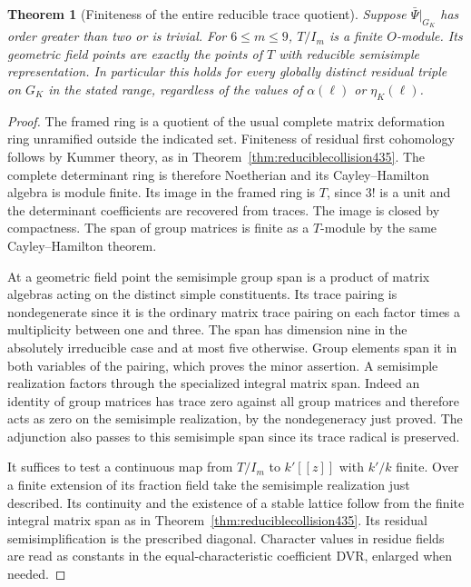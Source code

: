 \documentclass[a4paper,11pt]{article}
\newtheorem{theorem}[proposition]{Theorem}
\theoremstyle{definition}
\theoremstyle{remark}
\numberwithin{equation}{section}
\begin{document}
\begin{theorem}[Finiteness of the entire reducible trace quotient]\leavevmode
\label{thm:scalarinertiaplanes439}
Suppose \(\bar\Psi|_{G_K}\) has order greater than two or
is trivial. For \(6\le m\le9\), \(T/I_m\) is a finite
\(O\)-module. Its geometric field points are exactly the
points of \(T\) with reducible semisimple representation.
In particular this holds for every globally distinct residual
triple on \(G_K\) in the stated range, regardless of the
values of \(\alpha(\ell)\) or \(\eta_K(\ell)\).
\end{theorem}
\begin{proof}
The framed ring is a quotient of the usual complete matrix
deformation ring unramified outside the indicated set.
Finiteness of residual first cohomology follows by Kummer
theory, as in Theorem~\ref{thm:reduciblecollision435}.
The complete determinant ring is therefore Noetherian and
its Cayley--Hamilton algebra is module finite. Its image in
the framed ring is \(T\), since \(3!\) is a unit and the
determinant coefficients are recovered from traces. The
image is closed by compactness. The span of group matrices
is finite as a \(T\)-module by the same Cayley--Hamilton
theorem.~\cite{XI-VIII-chenevier364}

At a geometric field point the semisimple group span is a
product of matrix algebras acting on the distinct simple
constituents. Its trace pairing is nondegenerate since it
is the ordinary matrix trace pairing on each factor times a
multiplicity between one and three. The span has dimension
nine in the absolutely irreducible case and at most five
otherwise. Group elements span it in both variables of the
pairing, which proves the minor assertion. A semisimple
realization factors through the specialized integral matrix
span. Indeed an identity of group matrices has trace zero
against all group matrices and therefore acts as zero on
the semisimple realization, by the nondegeneracy just proved.
The adjunction also passes to this semisimple span since its
trace radical is preserved.

It suffices to test a continuous map from \(T/I_m\) to
\(k'[[z]]\) with \(k'/k\) finite. Over a finite extension of
its fraction field take the semisimple realization just
described. Its continuity and the existence of a stable
lattice follow from the finite integral matrix span as in
Theorem~\ref{thm:reduciblecollision435}. Its residual
semisimplification is the prescribed diagonal. Character
values in residue fields are read as constants in the
equal-characteristic coefficient DVR, enlarged when needed.


\end{proof}
\end{document}
